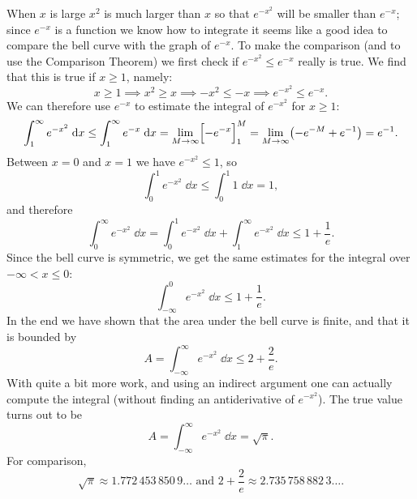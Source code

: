 When $x$ is large $x^2$ is much larger than $x$ so that $e^{-x^2}$ will be
smaller than $e^{-x}$; since $e^{-x}$ is a function we know how to integrate it
seems like a good idea to compare the bell curve with the graph of $e^{-x}$.  To
make the comparison (and to use the Comparison Theorem) we first check if
$e^{-x^2} \leq e^{-x}$ really is true.  We find that this is true if $x\geq 1$,
namely:
\[
x\geq 1 \implies x^2\geq x \implies -x^2\leq -x \implies e^{-x^2} \leq
e^{-x}.
\]
We can therefore use $e^{-x}$ to estimate the integral of $e^{-x^2}$ for $x\geq
1$:
\[
\int_1^\infty e^{-x^2}\;\mathrm{d} x \leq \int_1^\infty e^{-x}\;\mathrm{d} x
=\lim_{M\to\infty} \Bigl[-e^{-x}\Bigr]_1^M =\lim_{M\to\infty}
\bigl(-e^{-M}+e^{-1}\bigr) = e^{-1}.
\]
Between $x=0$ and $x=1$ we have $e^{-x^2} \leq 1$, so
\[
\int_0^1 e^{-x^2}\; \dd x \leq \int_0^1 1\;\dd x = 1,
\]
and therefore
\[
\int_0^\infty e^{-x^2}\;\dd x = \int_0^1 e^{-x^2}\;\dd x +
\int_1^\infty e^{-x^2}\;\dd x \leq 1+\frac{1} {e}.
\]
Since the bell curve is symmetric, we get the same estimates for the integral
over $-\infty<x\leq 0$:
\[
\int_{-\infty}^0 e^{-x^2}\;\dd x \leq 1+\frac{1} {e}.
\]
In the end we have shown that the area under the bell curve is finite, and that
it is bounded by
\[
A = \int_{-\infty}^\infty e^{-x^2}\;\dd x \leq 2 + \frac{2} {e}.
\]
With quite a bit more work, and using an indirect argument one can actually
compute the integral (without finding an antiderivative of $e^{-x^2}$).  The
true value turns out to be
\[
A = \int_{-\infty}^\infty e^{-x^2}\;\dd x = \sqrt{\pi}.
\]
For comparison,
\[
\sqrt{\pi} \approx 1.772\,453\,850\,9\ldots \text{ and } 2 + \frac{2}
{e} \approx 2.735\,758\,882\,3\ldots.
\]

